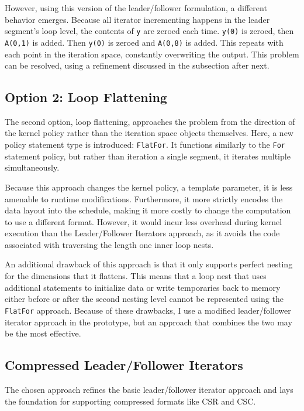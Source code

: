 However, using this version of the leader/follower formulation, a different behavior emerges.
Because all iterator incrementing happens in the leader segment's loop level, the contents of \verb.y. are zeroed each time.
\verb.y(0). is zeroed, then \verb.A(0,1). is added.
Then \verb.y(0). is zeroed and \verb.A(0,8). is added.
This repeats with each point in the iteration space, constantly overwriting the output. 
This problem can be resolved, using a refinement discussed in the subsection after next.

\subsection{Option 2: Loop Flattening}

The second option, loop flattening, approaches the problem from the direction of the kernel policy rather than the iteration space objects themselves.
Here, a new policy statement type is introduced: \verb.FlatFor.. 
It functions similarly to the \verb.For. statement policy, but rather than iteration a single segment, it iterates multiple simultaneously. 

Because this approach changes the kernel policy, a template parameter, it is less amenable to runtime modifications. 
Furthermore, it more strictly encodes the data layout into the schedule, making it more costly to change the computation to use a different format.
However, it would incur less overhead during kernel execution than the Leader/Follower Iterators approach, as it avoids the code associated with traversing the length one inner loop nests.

An additional drawback of this approach is that it only supports perfect nesting for the dimensions that it flattens. 
This means that a loop nest that uses additional statements to initialize data or write temporaries back to memory either before or after the second nesting level cannot be represented using the \verb.FlatFor. approach.
Because of these drawbacks, I use a modified leader/follower iterator approach in the prototype, but an approach that combines the two may be the most effective.

\subsection{Compressed Leader/Follower Iterators}

The chosen approach refines the basic leader/follower iterator approach and lays the foundation for supporting compressed formats like CSR and CSC.

